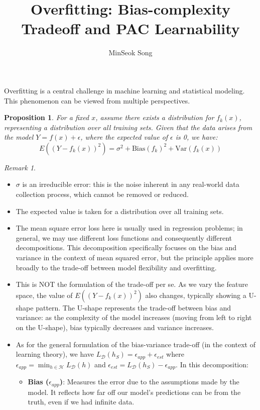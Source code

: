 \documentclass{article}
\newtheorem{proposition}[theorem]{Proposition}
\theoremstyle{remark}
\newtheorem{remark}[example]{Remark}
\begin{document}
\title{Overfitting: Bias-complexity Tradeoff and PAC Learnability}
\author{MinSeok Song}
\date{}
\maketitle
Overfitting is a central challenge in machine learning and statistical modeling. This phenomenon can be viewed from multiple perspectives.
\begin{proposition}
For a fixed $x$, assume there exists a distribution for $f_k(x)$, representing a distribution over all training sets. Given that the data arises from the model $Y=f(x)+\epsilon$, where the expected value of $\epsilon$ is 0, we have:
\[E((Y-f_k(x))^2) = \sigma^2 + \text{Bias}(f_k)^2 + \text{Var}(f_k(x))\]
\end{proposition}
\begin{remark}
\begin{itemize}
    \item $\sigma$ is an irreducible error: this is the noise inherent in any real-world data collection process, which cannot be removed or reduced.
    
    \item The expected value is taken for a distribution over all training sets.
    
    \item The mean square error loss here is usually used in regression problems; in general, we may use different loss functions and consequently different decompositions. This decomposition specifically focuses on the bias and variance in the context of mean squared error, but the principle applies more broadly to the trade-off between model flexibility and overfitting.
    
    \item This is NOT the formulation of the trade-off per se. As we vary the feature space, the value of $E((Y-f_k(x))^2)$ also changes, typically showing a U-shape pattern. The U-shape represents the trade-off between bias and variance: as the complexity of the model increases (moving from left to right on the U-shape), bias typically decreases and variance increases.
    
    \item As for the general formulation of the bias-variance trade-off (in the context of learning theory), we have $L_\mathcal{D}(h_S)=\epsilon_{app}+\epsilon_{est}$ where $\epsilon_{app}=\min_{h\in\mathcal{H}}L_\mathcal{D}(h)$ and $\epsilon_{est}=L_\mathcal{D}(h_S)-\epsilon_{app}$. In this decomposition:
    \begin{itemize}
        \item \textbf{Bias ($\epsilon_{app}$)}: Measures the error due to the assumptions made by the model. It reflects how far off our model's predictions can be from the truth, even if we had infinite data.
      

\end{itemize}
\end{itemize}
\end{remark}
\end{document}
